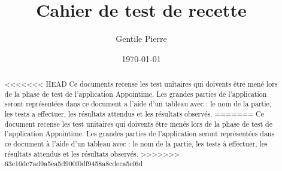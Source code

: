 \documentclass{article}
\author{Gentile Pierre}
\date{\today}
\title{Cahier de test de recette}
\begin{document}
\maketitle

\begin{abstract}
<<<<<<< HEAD
  Ce documents recense les test unitaires qui doivents être mené lors de la phase de test de l'application Appointime. Les grandes parties de l'application seront représentées dans ce document a l'aide d'un tableau avec : le nom de la partie, les tests a effectuer, les résultats attendus et les résultats observés.
=======
  Ce document recense les test unitaires qui doivents être menés lors de la phase de test de l'application Appointime. Les grandes parties de l'application seront représentées dans ce document à l'aide d'un tableau avec : le nom de la partie, les tests à effectuer, les résultats attendus et les résultats observés.
>>>>>>> 63e10de7ad9a5ea5d900f0df9458a8cdeca5ef6d
\end{abstract}
\end{document}
